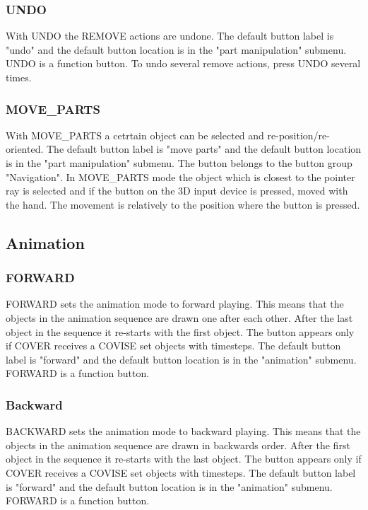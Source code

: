 \subsubsection{UNDO}
With UNDO the REMOVE actions are undone.
The default button label is "undo" and
the default button location is in the "part manipulation" submenu. 
UNDO is a function button. To undo several remove actions, press UNDO
several times.

\subsubsection{MOVE\_PARTS}

With MOVE\_PARTS a cetrtain object can be selected and re-position/re-oriented.
The default button label is "move parts" and
the default button location is in the "part manipulation" submenu. 
The button belongs to the button group "Navigation".
In MOVE\_PARTS mode the object which is closest to the pointer ray is selected
and if the button on the 3D input device is pressed, moved with the
hand. The movement is relatively to the position where the button is pressed.
 


\subsection{Animation}
		
\subsubsection{FORWARD}

FORWARD sets the animation mode to forward playing. This means that
the objects in the animation sequence are drawn one after each other. After the
last object in the sequence it re-starts with the first object. The button appears 
only if COVER receives a COVISE set objects with timesteps.
The default button label is "forward" and
the default button location is in the "animation" submenu.  
FORWARD is a function button.


\subsubsection{Backward}
BACKWARD sets the animation mode to backward playing. This means that
the objects in the animation sequence are drawn in backwards order. After the
first object in the sequence it re-starts with the last object.
The button appears 
only if COVER receives a COVISE set objects with timesteps.
The default button label is "forward" and
the default button location is in the "animation" submenu.  
FORWARD is a function button.

